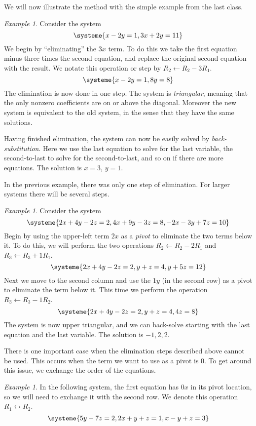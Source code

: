 \documentclass[11pt,oneside]{amsbook}
\theoremstyle{definition}
\theoremstyle{plain}
\theoremstyle{definition}
\theoremstyle{remark}
\newtheorem{example}[theorem]{Example}
\numberwithin{equation}{section}
\numberwithin{figure}{section}
\begin{document}
We will now illustrate the method with the simple example from the last class.

\begin{example}
  Consider the system
  \[\systeme{x-2y=1,3x+2y=11}
  \]
  We begin by ``eliminating'' the $3x$ term. To do this we take the first equation minus three times the second equation, and replace the original second equation with the result. We notate this operation or step by $R_2\leftarrow R_2-3R_1$.
  \[\systeme{x-2y=1,8y=8}
  \]
  The elimination is now done in one step. The system is \emph{triangular}, meaning that the only nonzero coefficients are on or above the diagonal. Moreover the new system is equivalent to the old system, in the sense that they have the same solutions.

  Having finished elimination, the system can now be easily solved by \emph{back-substitution}. Here we use the last equation to solve for the last variable, the second-to-last to solve for the second-to-last, and so on if there are more equations. The solution is $x=3$, $y=1$.
\end{example}

In the previous example, there was only one step of elimination. For larger systems there will be several steps.

\begin{example}
  Consider the system
  \[\systeme{2x+4y-2z=2,4x+9y-3z=8,-2x-3y+7z=10}
  \]
  Begin by using the upper-left term $2x$ as a \emph{pivot} to eliminate the two terms below it. To do this, we will perform the two operations $R_2\leftarrow R_2-2R_1$ and $R_3\leftarrow R_3+1R_1$.
  \[\systeme{2x+4y-2z=2,y+z=4,y+5z=12}
  \]
  Next we move to the second column and use the $1y$ (in the second row) as a pivot to eliminate the term below it. This time we perform the operation $R_3\leftarrow R_3-1R_2$.
  \[\systeme{2x+4y-2z=2,y+z=4,4z=8}
  \]
  The system is now upper triangular, and we can back-solve starting with the last equation and the last variable. The solution is $-1,2,2$.
\end{example}

There is one important case when the elimination steps described above cannot be used. This occurs when the term we want to use as a pivot is $0$. To get around this issue, we exchange the order of the equations.

\begin{example}
  In the following system, the first equation has $0x$ in its pivot location, so we will need to exchange it with the second row. We denote this operation $R_1\leftrightarrow R_2$.
  \[\systeme{5y-7z=2,2x+y+z=1,x-y+z=3}
  \]
\end{example}
\end{document}
